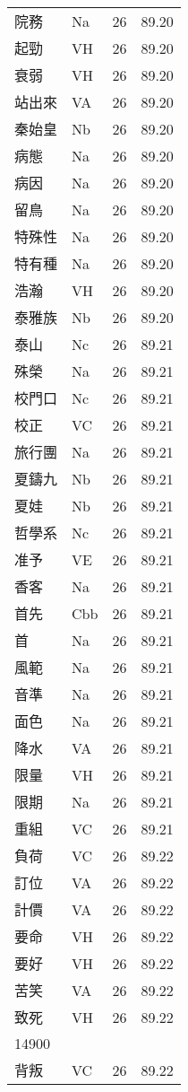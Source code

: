 \documentclass[twocolumn]{book}
\begin{document}
\begin{supertabular}{llrr}
院務 & Na & 26 &  89.20\\
起勁 & VH & 26 &  89.20\\
衰弱 & VH & 26 &  89.20\\
站出來 & VA & 26 &  89.20\\
秦始皇 & Nb & 26 &  89.20\\
病態 & Na & 26 &  89.20\\
病因 & Na & 26 &  89.20\\
留鳥 & Na & 26 &  89.20\\
特殊性 & Na & 26 &  89.20\\
特有種 & Na & 26 &  89.20\\
浩瀚 & VH & 26 &  89.20\\
泰雅族 & Nb & 26 &  89.20\\
泰山 & Nc & 26 &  89.21\\
殊榮 & Na & 26 &  89.21\\
校門口 & Nc & 26 &  89.21\\
校正 & VC & 26 &  89.21\\
旅行團 & Na & 26 &  89.21\\
夏鑄九 & Nb & 26 &  89.21\\
夏娃 & Nb & 26 &  89.21\\
哲學系 & Nc & 26 &  89.21\\
准予 & VE & 26 &  89.21\\
香客 & Na & 26 &  89.21\\
首先 & Cbb & 26 &  89.21\\
首 & Na & 26 &  89.21\\
風範 & Na & 26 &  89.21\\
音準 & Na & 26 &  89.21\\
面色 & Na & 26 &  89.21\\
降水 & VA & 26 &  89.21\\
限量 & VH & 26 &  89.21\\
限期 & Na & 26 &  89.21\\
重組 & VC & 26 &  89.21\\
負荷 & VC & 26 &  89.22\\
訂位 & VA & 26 &  89.22\\
計價 & VA & 26 &  89.22\\
要命 & VH & 26 &  89.22\\
要好 & VH & 26 &  89.22\\
苦笑 & VA & 26 &  89.22\\
致死 & VH & 26 &  89.22\\
14900\\
背叛 & VC & 26 &  89.22\\

\end{supertabular}
\end{document}
